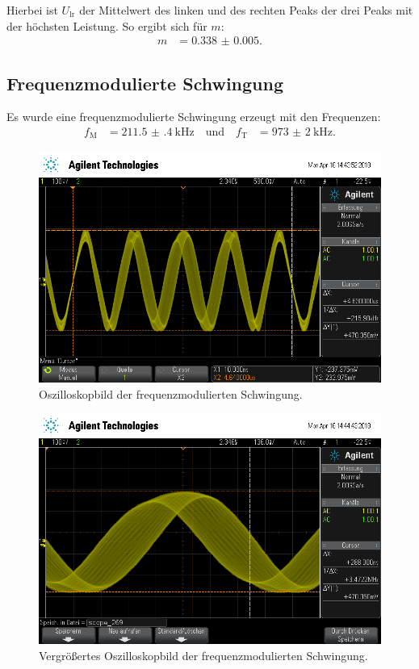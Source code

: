 Hierbei ist $U_\text{lr}$ der Mittelwert des linken und des rechten Peaks der drei Peaks mit der höchsten Leistung.
So ergibt sich für $m$:
\begin{align*}
  m &= \num{0.338(5)}.
\end{align*}

\subsection{Frequenzmodulierte Schwingung}

Es wurde eine frequenzmodulierte Schwingung erzeugt mit den Frequenzen:
\begin{align*}
  f_\text{M} &= \SI{211.5(4)}{\kilo\hertz} \quad\text{und}\quad f_\text{T} &= \SI{973(2)}{\kilo\hertz}.
\end{align*}
\begin{figure}[h]
  \centering
  \includegraphics[width=.9\textwidth]{Oszi_Pics/freqModRing.png}
  \caption{Oszilloskopbild der frequenzmodulierten Schwingung.}
  \label{fig:freqModRing}
\end{figure}
\begin{figure}[h]
  \centering
  \includegraphics[width=.9\textwidth]{Oszi_Pics/freqModZoom.png}
  \caption{Vergrößertes Oszilloskopbild der frequenzmodulierten Schwingung.}
  \label{fig:freqModZoom}
\end{figure}
